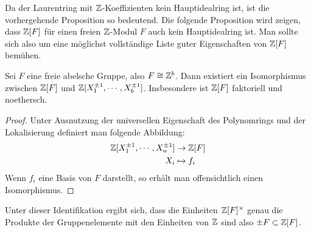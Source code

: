 Da der Laurentring mit $\mathbb{Z}$-Koeffizienten kein Hauptidealring ist, ist die vorhergehende Proposition so bedeutend. Die folgende Proposition wird zeigen, dass $\mathbb{Z}[F]$ für einen freien $\mathbb{Z}$-Modul $F$ auch kein Hauptidealring ist. Man sollte sich also um eine möglichst vollständige Liste guter Eigenschaften von $\mathbb{Z}[F]$ bemühen.

\begin{prop}
\label{prop:gruppenringnoethersch}
	Sei $F$ eine freie abelsche Gruppe, also $F\cong \mathbb{Z}^b$. Dann existiert ein Isomorphismus zwischen $\mathbb{Z}[F]$ und $\mathbb{Z}[X_1^{\pm 1},\cdots,X_{b}^{\pm 1}] $. Insbesondere ist $\mathbb{Z}[F]$ faktoriell und noethersch.
\end{prop}
\begin{proof}
	Unter Ausnutzung der universellen Eigenschaft des Polynomrings und der Lokalisierung definiert man folgende Abbildung:
	\begin{align*}
			\mathbb{Z}[X_1^{\pm 1},\cdots,X_{n}^{\pm 1}] & \to  \mathbb{Z}[F]\\
			X_i &\mapsto  f_i
	\end{align*}
	Wenn $f_i$ eine Basis von $F$ darstellt, so erhält man offensichtlich einen Isomorphismus.
\end{proof}

\begin{bem}
\label{bem:einheitengruppenring}
	Unter dieser Identifikation ergibt sich, dass die Einheiten $\mathbb{Z}[F]^\times$ genau die Produkte der Gruppenelemente mit den Einheiten von $\mathbb{Z}$ sind also $\pm F \subset \mathbb{Z}[F]$.
\end{bem}

